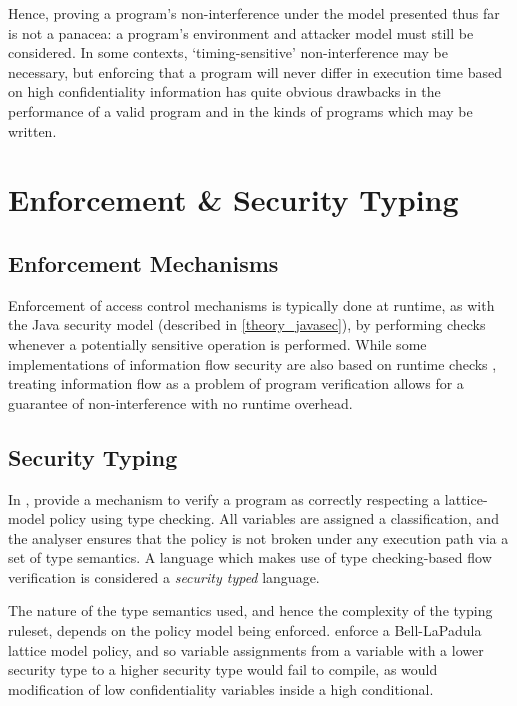 Hence, proving a program's non-interference under the model presented thus far is not a panacea: a program's environment and attacker model must still be considered. In some contexts, `timing-sensitive' non-interference may be necessary, but enforcing that a program will never differ in execution time based on high confidentiality information has quite obvious drawbacks in the performance of a valid program and in the kinds of programs which may be written.

\section{Enforcement \& Security Typing}

\subsection{Enforcement Mechanisms}

Enforcement of access control mechanisms is typically done at runtime, as with the Java security model (described in \ref{theory_javasec}), by performing checks whenever a potentially sensitive operation is performed. While some implementations of information flow security are also based on runtime checks \cite{austin2009runtimeflow} \cite{degroef2012flowfox} \cite{polikarpova2016lifty}, treating information flow as a problem of program verification allows for a guarantee of non-interference with no runtime overhead.

\subsection{Security Typing}

In , \citeauthor{denning1977certification} \cite{denning1977certification} provide a mechanism to verify a program as correctly respecting a lattice-model policy using type checking. All variables are assigned a classification, and the analyser ensures that the policy is not broken under any execution path via a set of type semantics. A language which makes use of type checking-based flow verification is considered a \textit{security typed} language.

The nature of the type semantics used, and hence the complexity of the typing ruleset, depends on the policy model being enforced. \citeauthor{denning1977certification} \cite{denning1977certification} enforce a Bell-LaPadula lattice model policy, and so variable assignments from a variable with a lower security type to a higher security type would fail to compile, as would modification of low confidentiality variables inside a high conditional.

